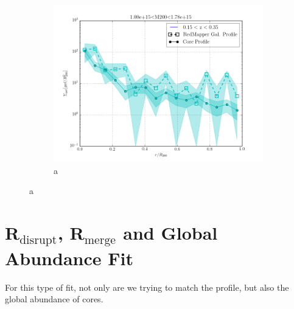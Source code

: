 \documentclass[twocolumn]{article}
\begin{document}
\begin{figure}
\begin{subfigure}{.5\textwidth}
    \centering\includegraphics[width=1.0\linewidth]{figs/cfn/basic_rd_rm.param/plot_zmrs.py/fig6.png}
    \caption{a}
  \end{subfigure}
\end{figure}
\section{R$_{\mathrm{disrupt}}$,  R$_{\mathrm{merge}}$ and Global Abundance Fit} 
\label{sec:abundance example}
For this type of fit, not only are we trying to match the profile, but
also the global abundance of cores. 
\end{document}
